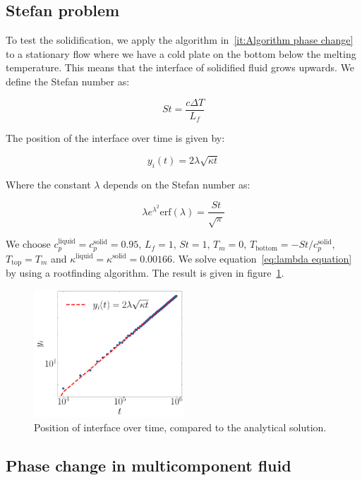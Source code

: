 \subsection{Stefan problem}
To test the solidification, we apply the algorithm in~\ref{it:Algorithm phase change} to a stationary flow where we have a cold plate on the bottom below the melting temperature. This means that the interface of solidified fluid grows upwards. We define the Stefan number as:

\begin{equation}
    \textit{St} = \frac{c \Delta T}{L_f}
\end{equation}

The position of the interface over time is given by:

\begin{equation}
    y_i(t) = 2 \lambda \sqrt{\kappa t}
\end{equation}

Where the constant $\lambda$ depends on the Stefan number as:

\begin{equation}\label{eq:lambda equation}
    \lambda e^{\lambda^2} \text{erf}(\lambda) = \frac{\textit{St}}{\sqrt{\pi}}
\end{equation}

We choose $c_p^{\text{liquid}} = c_p^{\text{solid}} = 0.95$, $L_f = 1$, $\textit{St} = 1$, $T_m = 0$, $T_{\text{bottom}} = -\textit{St}/c_p^{\text{solid}}$, $T_{\text{top}} = T_m$ and $\kappa^{\text{liquid}} = \kappa^{\text{solid}} = 0.00166$. We solve equation~\ref{eq:lambda equation} by using a rootfinding algorithm. The result is given in figure~\ref{fig:stefan}.

\begin{figure}[htp]
    \centering
    \includegraphics[width=0.5\textwidth]{figures/stefan.pdf}
    \caption{Position of interface over time, compared to the analytical solution.}\label{fig:stefan}
\end{figure}

\subsection{Phase change in multicomponent fluid}
